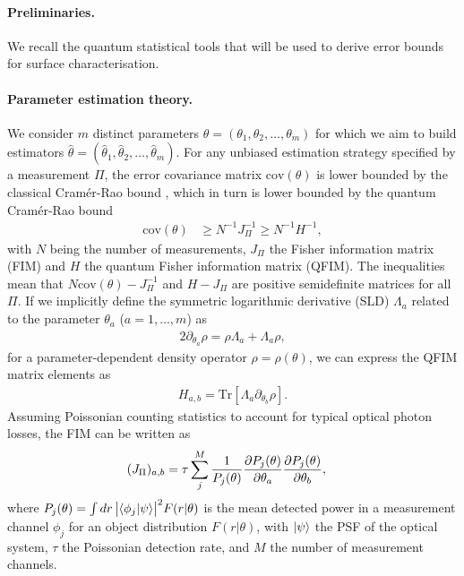 \documentclass[reprint,amsmath,amssymb,aps,prl,floatfix,groupedaddress,superscriptaddress]{revtex4-2}
\begin{document}
\paragraph{\bfseries Preliminaries.\label{sec:prelim}}
We recall the quantum statistical tools that will be used to derive error bounds for surface characterisation.

\paragraph{Parameter estimation theory.\label{sec:parameterestimation}}
We consider $m$ distinct parameters $\theta = (\theta_1,\theta_2,\dots,\theta_m)$ for which we aim to build estimators $ \hat{\theta} = (\hat{\theta}_1,\hat{\theta}_2,\dots,\hat{\theta}_m)$. For any unbiased estimation strategy specified by a measurement $\Pi$, the error covariance matrix $\text{cov}(\theta)$ is lower bounded by the classical Cram\'er-Rao bound \cite{lehmann2006theory,van2004detection}, which in turn is lower bounded by the quantum Cram\'er-Rao bound \cite{helstrom1969quantum,braunstein1994statistical}
\begin{align}
    \text{cov}(\theta) &\geq N^{-1} J_\Pi^{-1} \geq N^{-1} H^{-1},
\end{align}
with $N$ being the number of measurements, $J_\Pi$ the Fisher information matrix (FIM) and $H$ the quantum Fisher information matrix (QFIM). The inequalities mean that $N\text{cov}(\theta) - J_\Pi^{-1}$  and $H-J_\Pi$ are positive semidefinite matrices for all $\Pi$. If we implicitly define the symmetric logarithmic derivative (SLD) $\Lambda_a$ related to the parameter $\theta_a$ ($a=1,\dots,m$) as
\begin{align}
   2{\partial_{\theta_a} \rho} = \rho \Lambda_a+ \Lambda_a \rho,
\label{def:sld}
\end{align}
for a parameter-dependent density operator $\rho=\rho(\theta)$, we can express the QFIM matrix elements as
\begin{align}
    H_{a,b} = \text{Tr} \left [ \Lambda_{a} {\partial_{\theta_b} \rho} \right ].
\label{def:QFIM}
\end{align}
Assuming Poissonian counting statistics \cite{tsang2018subdiffraction} to account for typical optical photon losses, the FIM can be written as
\begin{align}
    ({J_\Pi})_{a,b} &= \tau \sum_j^M\frac{1}{P_j(\theta)} \pdv{P_j(\theta)}{\theta_a}  \pdv{P_j(\theta)}{\theta_b},
\label{eq:FI_MS}
\end{align}
where $P_j(\theta) = \int dr\, \big|\!\braket{\phi_j}{\psi}\!\big|^2 F(r|\theta)$ is the mean detected power in a measurement channel $\phi_j$ for an object distribution $F(r|\theta)$, with $\ket{\psi}$ the PSF of the optical system, $\tau$ the Poissonian detection rate, and $M$ the number of measurement channels.
\end{document}
